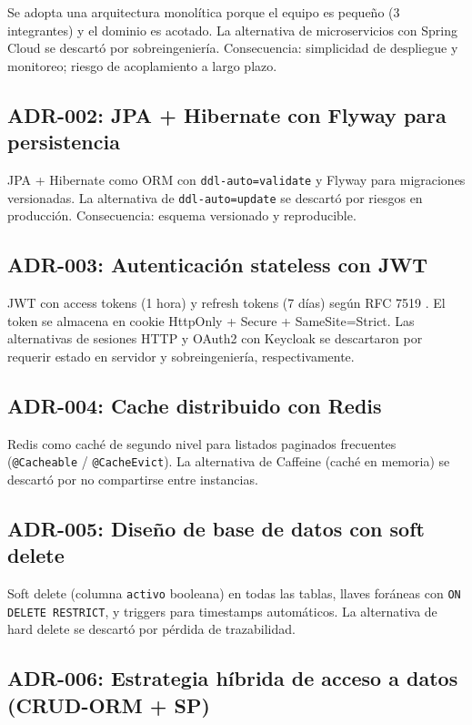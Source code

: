 Se adopta una arquitectura monolítica porque el equipo es pequeño (3 integrantes) y el dominio es acotado. La alternativa de microservicios con Spring Cloud se descartó por sobreingeniería. Consecuencia: simplicidad de despliegue y monitoreo; riesgo de acoplamiento a largo plazo.

\subsection{ADR-002: JPA + Hibernate con Flyway para persistencia}

JPA + Hibernate como ORM con \texttt{ddl-auto=validate} y Flyway para migraciones versionadas. La alternativa de \texttt{ddl-auto=update} se descartó por riesgos en producción. Consecuencia: esquema versionado y reproducible.

\subsection{ADR-003: Autenticación stateless con JWT}

JWT con access tokens (1 hora) y refresh tokens (7 días) según RFC 7519 \cite{rfc7519}. El token se almacena en cookie HttpOnly + Secure + SameSite=Strict. Las alternativas de sesiones HTTP y OAuth2 con Keycloak se descartaron por requerir estado en servidor y sobreingeniería, respectivamente.

\subsection{ADR-004: Cache distribuido con Redis}

Redis como caché de segundo nivel para listados paginados frecuentes (\texttt{@Cacheable} / \texttt{@CacheEvict}). La alternativa de Caffeine (caché en memoria) se descartó por no compartirse entre instancias.

\subsection{ADR-005: Diseño de base de datos con soft delete}

Soft delete (columna \texttt{activo} booleana) en todas las tablas, llaves foráneas con \texttt{ON DELETE RESTRICT}, y triggers para timestamps automáticos. La alternativa de hard delete se descartó por pérdida de trazabilidad.

\subsection{ADR-006: Estrategia híbrida de acceso a datos (CRUD-ORM + SP)}

